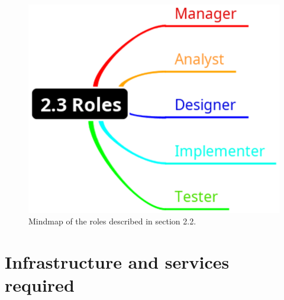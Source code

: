 \documentclass[11pt, twoside, a4paper]{book}
\begin{document}
				\begin{figure}[!ht]
					\centering
  					\includegraphics[scale=0.4]{2-3_Roles.eps}
					\caption{Mindmap of the roles described in section 2.2.}
				\end{figure}             

				      		
			\section{Infrastructure and services required}
				
\end{document}
